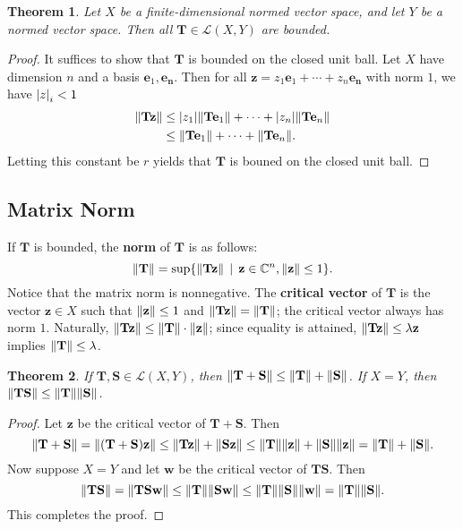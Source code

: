\documentclass[11pt]{article}
\newtheorem{theorem}{Theorem}
\renewcommand{\vec}[1]{\mathbf{#1}}
\newcommand{\mat}[1]{\mathbf{#1}}
\begin{document}
\begin{adjustwidth}{0.5cm}{}
  \begin{theorem}
    Let $X$ be a finite-dimensional normed vector space, and let $Y$ be a normed vector space. Then all $\mat{T} \in \mathcal{L}(X, Y)$ are bounded.
  \end{theorem}  
  \begin{proof}
    It suffices to show that $\mat{T}$ is bounded on the closed unit ball. Let $X$ have dimension $n$ and a basis $\vec{e}_{1}, \vec{e_{n}}$. Then for all $\vec{z} = z_{1} \vec{e}_{1} + \cdots + z_{n} \vec{e_{n}}$ with norm $1$, we have $\abs{z}_{i} < 1$
		\begin{align*}
      \norm{\mat{T} \vec{z}} &\le \abs{z_{1}} \norm{\mat{T} \vec{e}_{1}} + \cdots + \abs{z_{n}} \norm{\mat{T} \vec{e}_{n}} \\
			&\le \norm{\mat{T} \vec{e}_{1}} + \cdots + \norm{\mat{T} \vec{e}_{n}}.
		\end{align*}
    Letting this constant be $r$ yields that $\mat{T}$ is bouned on the closed unit ball.
  \end{proof}
\end{adjustwidth}

\subsection{Matrix Norm}

If $\mat{T}$ is bounded, the \textbf{norm} of $\mat{T}$ is as follows:
\[
	\norm{\mat{T}} = \sup \{ \norm{\mat{T} \vec{z}} \, \mid \, \vec{z} \in \mathbb{C}^{n}, \norm{\vec{z}} \le 1\}.
\]
Notice that the matrix norm is nonnegative. The \textbf{critical vector} of $\mat{T}$ is the vector $\vec{z} \in X$ such that $\norm{\vec{z}} \le 1$ and $\norm{\mat{T} \vec{z}} = \norm{\mat{T}}$; the critical vector always has norm $1$. Naturally, $\norm{\mat{T} \vec{z}} \le \norm{\mat{T}} \cdot \norm{\vec{z}}$; since equality is attained, $\norm{\mat{T} \vec{z}} \le \lambda \vec{z}$ implies $\norm{\vec{T}} \le \lambda$.

\begin{theorem}
	If $\mat{T}, \mat{S} \in \mathcal{L}(X, Y)$, then $\norm{\mat{T} + \mat{S}} \le \norm{\mat{T}} + \norm{\mat{S}}$. If $X = Y$, then $\norm{\mat{TS}} \le \norm{\mat{T}} \norm{\mat{S}}$.
\end{theorem}
\begin{adjustwidth}{0.5cm}{}
	\begin{proof}
		Let $\vec{z}$ be the critical vector of $\mat{T} + \mat{S}$. Then
		\[
			\norm{\mat{T} + \mat{S}} = \norm{(\mat{T} + \mat{S})\vec{z}} \le \norm{\mat{T} \vec{z}} + \norm{\mat{S} \vec{z}} \le \norm{\mat{T}} \norm{\vec{z}} + \norm{\mat{S}} \norm{\vec{z}} = \norm{\mat{T}} + \norm{\mat{S}}.
		\]
		Now suppose $X = Y$ and let $\vec{w}$ be the critical vector of $\mat{TS}$. Then
		\[
			\norm{\mat{TS}} = \norm{\mat{TS} \vec{w}} \le \norm{\mat{T}} \norm{\mat{S} \vec{w}} \le \norm{\mat{T}} \norm{\mat{S}} \norm{\vec{w}} = \norm{\mat{T}} \norm{\mat{S}}.
		\]
		This completes the proof.
	\end{proof}
\end{adjustwidth}
\end{document}
